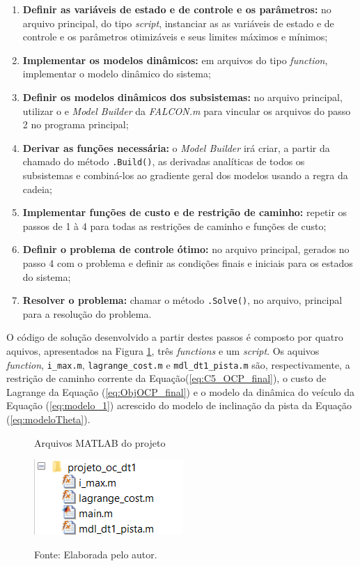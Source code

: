 \begin{enumerate}
    \item \textbf{Definir as variáveis de estado e de controle e os parâmetros:} no arquivo principal, do tipo \textit{script}, instanciar as  as variáveis de estado e de controle e os parâmetros otimizáveis e seus limites máximos e mínimos;
    \item \textbf{Implementar os modelos dinâmicos:} em arquivos do tipo \textit{function}, implementar o modelo dinâmico do sistema; 
    \item \textbf{Definir os modelos dinâmicos dos subsistemas:} no arquivo principal, utilizar o e \textit{Model Builder} da \textit{FALCON.m} para vincular os arquivos do passo 2 no programa principal;
    \item \textbf{Derivar as funções necessária:} o \textit{Model Builder} irá criar, a partir da chamado do método \lstinline[style=Matlab-editor]{.Build()}, as derivadas analíticas de todos os subsistemas e combiná-los ao gradiente geral dos modelos usando a regra da cadeia;
    \item \textbf{Implementar funções de custo e de restrição de caminho:} repetir os passos de 1 à 4 para todas as restrições de caminho e funções de custo;
    \item \textbf{Definir o problema de controle ótimo:}  no arquivo principal, gerados no passo 4 com o problema e definir as condições finais e iniciais para os estados do sistema;
    \item \textbf{Resolver o problema:} chamar o método \lstinline[style=Matlab-editor]{.Solve()}, no arquivo, principal para a resolução do problema.
\end{enumerate}

O código de solução desenvolvido a partir destes passos é composto por quatro aquivos, apresentados na Figura \ref{fig:matlab_files}, três \textit{functions} e um \textit{script}. Os aquivos \textit{function}, \lstinline[style=Matlab-editor]{i_max.m},
\lstinline[style=Matlab-editor]{lagrange_cost.m} e \lstinline[style=Matlab-editor]{mdl_dt1_pista.m} são, respectivamente, 
a restrição de caminho corrente da Equação(\ref{eq:C5_OCP_final}), o custo de Lagrange da Equação (\ref{eq:ObjOCP_final}) e o modelo da dinâmica do veículo da Equação (\ref{eq:modelo_1}) acrescido do modelo de inclinação da pista da Equação (\ref{eq:modeloTheta}).

\begin{figure}[h]
    \centering
    \caption{Arquivos MATLAB  do projeto}
    \includegraphics[]{Metodologia/Figuras/matlab_files.png}
    \label{fig:matlab_files}
    \caption*{\footnotesize{Fonte: Elaborada pelo autor.}}
\end{figure}


